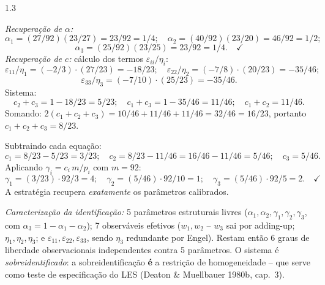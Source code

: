 \documentclass[11pt,addpoints]{exam}
\begin{document}
\begin{spacing}{1.3}
\begin{questions}
\begin{parts}
\begin{solution}
\emph{Recuperação de $\alpha$:}
\[
    \alpha_1 = (27/92)(23/27) = 23/92 = 1/4;\quad
    \alpha_2 = (40/92)(23/20) = 46/92 = 1/2;
\]
\[
    \alpha_3 = (25/92)(23/25) = 23/92 = 1/4. \quad \checkmark
\]
\emph{Recuperação de $c$:} cálculo dos termos $\varepsilon_{ii}/\eta_i$:
\[
    \varepsilon_{11}/\eta_1 = (-2/3)\cdot(27/23) = -18/23;\quad
    \varepsilon_{22}/\eta_2 = (-7/8)\cdot(20/23) = -35/46;
\]
\[
    \varepsilon_{33}/\eta_3 = (-7/10)\cdot(25/23) = -35/46.
\]
Sistema:
\[
    c_2 + c_3 = 1 - 18/23 = 5/23;\quad
    c_1 + c_3 = 1 - 35/46 = 11/46;\quad
    c_1 + c_2 = 11/46.
\]
Somando: $2(c_1+c_2+c_3) = 10/46 + 11/46 + 11/46 = 32/46 = 16/23$, portanto $c_1+c_2+c_3 = 8/23$.

Subtraindo cada equação:
\[
    c_1 = 8/23 - 5/23 = 3/23;\quad
    c_2 = 8/23 - 11/46 = 16/46 - 11/46 = 5/46;\quad
    c_3 = 5/46.
\]
Aplicando $\gamma_i = c_i\, m/p_i$ com $m=92$:
\[
    \gamma_1 = (3/23)\cdot 92/3 = 4;\quad
    \gamma_2 = (5/46)\cdot 92/10 = 1;\quad
    \gamma_3 = (5/46)\cdot 92/5 = 2. \quad \checkmark
\]
A estratégia recupera \emph{exatamente} os parâmetros calibrados.

\emph{Caracterização da identificação:} 5 parâmetros estruturais livres ($\alpha_1, \alpha_2, \gamma_1, \gamma_2, \gamma_3$, com $\alpha_3 = 1 - \alpha_1 - \alpha_2$); 7 observáveis efetivos ($w_1, w_2$ -- $w_3$ sai por adding-up; $\eta_1, \eta_2, \eta_3$; e $\varepsilon_{11}, \varepsilon_{22}, \varepsilon_{33}$, sendo $\eta_3$ redundante por Engel). Restam então 6 graus de liberdade observacionais independentes contra 5 parâmetros. O sistema é \emph{sobreidentificado}: a sobreidentificação \textbf{é} a restrição de homogeneidade -- que serve como teste de especificação do LES (Deaton \& Muellbauer 1980b, cap.\ 3).


\end{solution}
\end{parts}
\end{questions}
\end{spacing}
\end{document}
